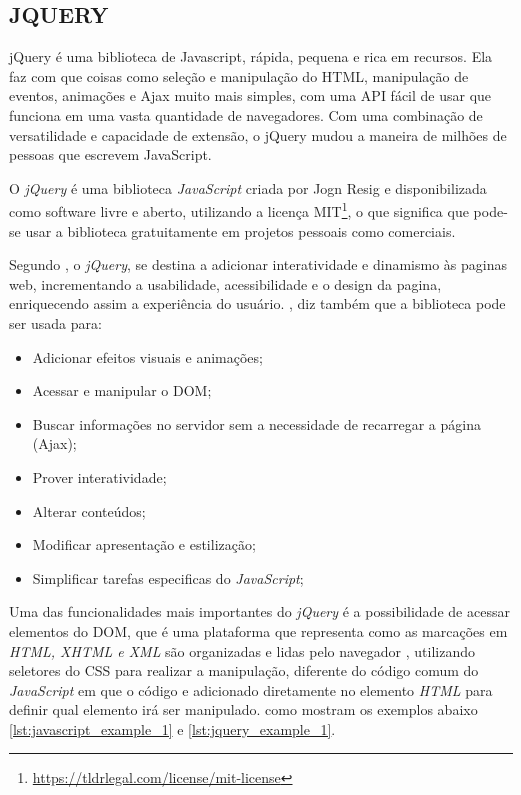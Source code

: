 \subsection{JQUERY}
\label{sec:jquery}

\begin{citacao}
    jQuery é uma biblioteca de Javascript, rápida, pequena e rica em recursos. Ela faz com que coisas como seleção e manipulação do HTML, manipulação de eventos, animações e Ajax muito mais simples, com uma API fácil de usar que funciona em uma vasta quantidade de navegadores. Com uma combinação de versatilidade e capacidade de extensão, o jQuery mudou a maneira de milhões de pessoas que escrevem JavaScript. \cite[tradução nossa]{jquery}
\end{citacao}

O \textit{jQuery} é uma biblioteca \textit{JavaScript} criada por Jogn Resig e disponibilizada como software livre e aberto, utilizando a licença \ac{MIT}\footnote{\url{https://tldrlegal.com/license/mit-license}}, o que significa que pode-se usar a biblioteca gratuitamente em projetos pessoais como comerciais.

Segundo \cite[p.~4]{silva-jquery}, o \textit{jQuery}, se destina a adicionar interatividade e dinamismo às paginas web, incrementando a usabilidade, acessibilidade e o design da pagina, enriquecendo assim a experiência do usuário. , diz também que a biblioteca pode ser usada para:
\begin{itemize}
    \item Adicionar efeitos visuais e animações;
    \item Acessar e manipular o DOM;
    \item Buscar informações no servidor sem a necessidade de recarregar a página (Ajax);
    \item Prover interatividade;
    \item Alterar conteúdos;
    \item Modificar apresentação e estilização;
    \item Simplificar tarefas especificas do \textit{JavaScript};
\end{itemize}

Uma das funcionalidades mais importantes do \textit{jQuery} é a possibilidade de acessar elementos do \ac{DOM}, que é uma plataforma que representa como as marcações em \textit{HTML, XHTML e XML} são organizadas e lidas pelo navegador \cite{franklin-dom}, utilizando seletores do \ac{CSS} para realizar a manipulação, diferente do código comum do \textit{JavaScript} em que o código e adicionado diretamente no elemento \textit{HTML} para definir qual elemento irá ser manipulado. como mostram os exemplos abaixo \ref{lst:javascript_example_1} e \ref{lst:jquery_example_1}.

